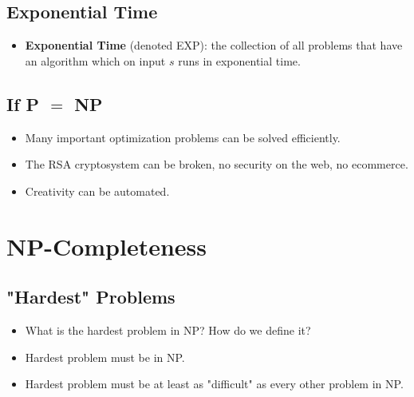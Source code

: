 \documentclass[12pt]{article}
\begin{document}
\subsection{Exponential Time}
\begin{itemize}
    \item \textbf{Exponential Time} (denoted EXP): the collection of all problems that have an algorithm which on input $s$ runs in exponential time.
\end{itemize}

\subsection{If P $=$ NP}
\begin{itemize}
    \item Many important optimization problems can be solved efficiently.
    \item The RSA cryptosystem can be broken, no security on the web, no ecommerce.
    \item Creativity can be automated.
\end{itemize}

\section{NP-Completeness}

\subsection{"Hardest" Problems}
\begin{itemize}
    \item What is the hardest problem in NP? How do we define it?
    \item Hardest problem must be in NP.
    \item Hardest problem must be at least as "difficult" as every other problem in NP.
\end{itemize}
\end{document}
